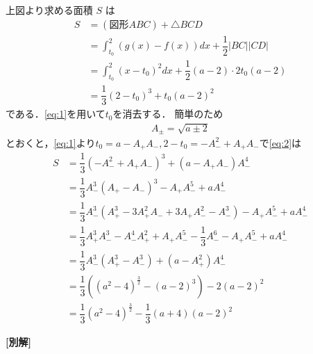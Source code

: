 \documentclass[../../main.tex]{subfiles}
\begin{document}
上図より求める面積 $S$ は
\begin{align}
  S
  &= (\text{図形}ABC)+\triangle BCD \\
  &= \int_{t_0}^2 (g(x) - f(x)) dx + \dfrac{1}{2} |BC||CD| \\
  &= \int_{t_0}^2 (x - t_0)^2 dx + \dfrac{1}{2} (a-2) \cdot 2t_0(a-2) \\
  &= \dfrac{1}{3} (2 - t_0)^3 + t_0 (a-2)^2 \label{eq:2}
\end{align}
である．\cref{eq:1}を用いて$t_0$を消去する．
簡単のため
\begin{align}
  A_{\pm} = \sqrt{a\pm 2} \label{eq:3}
\end{align}
とおくと，\cref{eq:1}より$t_0 = a-A_{+}A_{-}, 2-t_0 = -A_{-}^2 + A_{+}A_{-}$で\cref{eq:2}は
\begin{align}
  S
  &= \dfrac{1}{3}\left(-A_{-}^2 + A_{+}A_{-}\right)^3 + (a-A_{+}A_{-})A^4_{-} \\
  &= \dfrac{1}{3}A_{-}^3(A_{+}-A_{-})^3 - A_{+}A^5_{-} + a A^4_{-} \\
  &= \dfrac{1}{3}A_{-}^3(A^3_{+}-3A^2_{+}A_{-}+3A_{+}A^2_{-}-A^3_{-}) - A_{+}A^5_{-} + a A^4_{-} \\
  &= \dfrac{1}{3}A^3_{+}A^3_{-} - A^4_{-}A^2_{+}+A_{+}A^5_{-}-\dfrac{1}{3}A^6_{-} - A_{+}A^5_{-} + a A^4_{-} \\
  &= \dfrac{1}{3}A^3_{-}\left(A^3_{+}-A^3_{-}\right) +(a-A^2_{+}) A^4_{-} \\
  &= \dfrac{1}{3}\left((a^2-4)^{\frac{3}{2}} - (a-2)^3 \right) - 2 (a-2)^2 \\
  &= \dfrac{1}{3}(a^2-4)^{\frac{3}{2}} - \dfrac{1}{3}(a+4)(a-2)^2
\end{align}

{\bf [別解]}
\end{document}
